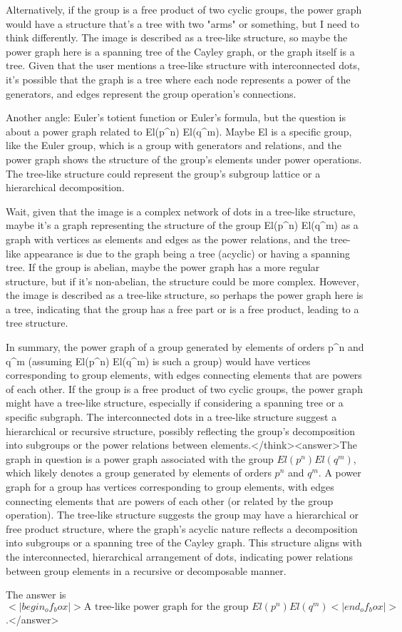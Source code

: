 Alternatively, if the group is a free product of two cyclic groups, the power graph would have a structure that's a tree with two "arms" or something, but I need to think differently. The image is described as a tree-like structure, so maybe the power graph here is a spanning tree of the Cayley graph, or the graph itself is a tree. Given that the user mentions a tree-like structure with interconnected dots, it's possible that the graph is a tree where each node represents a power of the generators, and edges represent the group operation's connections. 

Another angle: Euler's totient function or Euler's formula, but the question is about a power graph related to El(p^n) El(q^m). Maybe El is a specific group, like the Euler group, which is a group with generators and relations, and the power graph shows the structure of the group's elements under power operations. The tree-like structure could represent the group's subgroup lattice or a hierarchical decomposition. 

Wait, given that the image is a complex network of dots in a tree-like structure, maybe it's a graph representing the structure of the group El(p^n) El(q^m) as a graph with vertices as elements and edges as the power relations, and the tree-like appearance is due to the graph being a tree (acyclic) or having a spanning tree. If the group is abelian, maybe the power graph has a more regular structure, but if it's non-abelian, the structure could be more complex. However, the image is described as a tree-like structure, so perhaps the power graph here is a tree, indicating that the group has a free part or is a free product, leading to a tree structure. 

In summary, the power graph of a group generated by elements of orders p^n and q^m (assuming El(p^n) El(q^m) is such a group) would have vertices corresponding to group elements, with edges connecting elements that are powers of each other. If the group is a free product of two cyclic groups, the power graph might have a tree-like structure, especially if considering a spanning tree or a specific subgraph. The interconnected dots in a tree-like structure suggest a hierarchical or recursive structure, possibly reflecting the group's decomposition into subgroups or the power relations between elements.</think><answer>The graph in question is a power graph associated with the group \( El(p^n) El(q^m) \), which likely denotes a group generated by elements of orders \( p^n \) and \( q^m \). A power graph for a group has vertices corresponding to group elements, with edges connecting elements that are powers of each other (or related by the group operation). The tree-like structure suggests the group may have a hierarchical or free product structure, where the graph's acyclic nature reflects a decomposition into subgroups or a spanning tree of the Cayley graph. This structure aligns with the interconnected, hierarchical arrangement of dots, indicating power relations between group elements in a recursive or decomposable manner.  

The answer is \(<|begin_of_box|>\text{A tree-like power graph for the group } El(p^n) El(q^m)<|end_of_box|>\).</answer>
